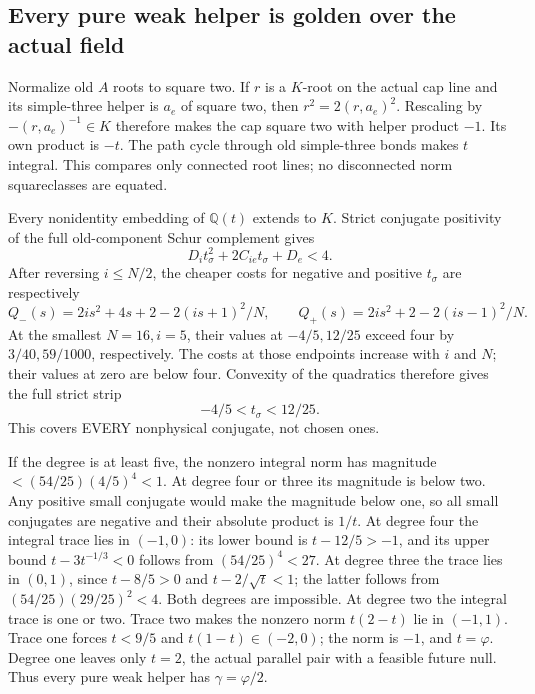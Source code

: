 \subsection{Every pure weak helper is golden over the actual field}
\label{app:arithgoldenfield}

Normalize old \(A\) roots to square two.
If \(r\) is a \(K\)-root on the actual cap line and its simple-three
helper is \(a_e\) of square two, then
\(r^2=2(r,a_e)^2\).  Rescaling by \(-(r,a_e)^{-1}\in K\)
therefore makes the cap square two with helper product \(-1\).
Its own product is \(-t\).
The path cycle through old simple-three bonds makes \(t\) integral.
This compares only connected root lines; no disconnected norm
squareclasses are equated.

Every nonidentity embedding of \(\mathbb Q(t)\) extends to \(K\).
Strict conjugate positivity of the full old-component Schur
complement gives
\[
                    D_it_\sigma^2+2C_{ie}t_\sigma+D_e<4 .
\]
After reversing \(i\le N/2\), the cheaper costs for negative and
positive \(t_\sigma\) are respectively
\[
 Q_-(s)=2is^2+4s+2-2(is+1)^2/N,\qquad
 Q_+(s)=2is^2+2-2(is-1)^2/N .
\]
At the smallest \(N=16,i=5\), their values at \(-4/5,12/25\)
exceed four by \(3/40,59/1000\), respectively.
The costs at those endpoints increase with \(i\) and \(N\);
their values at zero are below four.
Convexity of the quadratics therefore gives the full strict strip
\[
                         -4/5<t_\sigma<12/25 .
\tag{Agoldenstrip}\label{eq:arithAgoldenstrip}
\]
This covers EVERY nonphysical conjugate, not chosen ones.

If the degree is at least five, the nonzero integral norm has
magnitude \(<(54/25)(4/5)^4<1\).
At degree four or three its magnitude is below two.
Any positive small conjugate would make the magnitude below one,
so all small conjugates are negative and their absolute product
is \(1/t\).
At degree four the integral trace lies in \((-1,0)\):
its lower bound is \(t-12/5>-1\), and its upper bound
\(t-3t^{-1/3}<0\) follows from \((54/25)^4<27\).
At degree three the trace lies in \((0,1)\), since
\(t-8/5>0\) and \(t-2/\sqrt t<1\);
the latter follows from
\((54/25)(29/25)^2<4\).
Both degrees are impossible.
At degree two the integral trace is one or two.
Trace two makes the nonzero norm \(t(2-t)\) lie in \((-1,1)\).
Trace one forces \(t<9/5\) and \(t(1-t)\in(-2,0)\);
the norm is \(-1\), and \(t=\varphi\).
Degree one leaves only \(t=2\), the actual parallel pair with
a feasible future null.
Thus every pure weak helper has \(\gamma=\varphi/2\).


